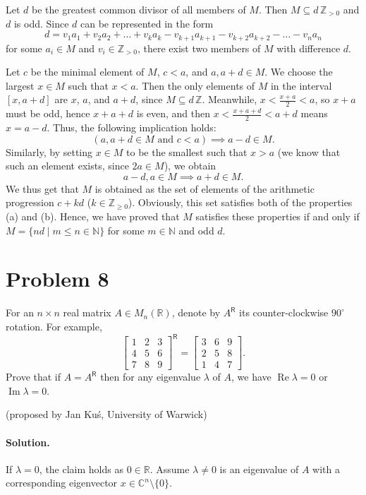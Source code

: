 \documentclass{article}
\begin{document}
Let $d$ be the greatest common divisor of all members of $M$. Then $M \subseteq d\,\mathbb{Z}_{>0}$ and $d$ is odd. Since $d$ can be represented in the form
\[
d = v_1 a_1 + v_2 a_2 + \ldots + v_k a_k - v_{k+1} a_{k+1} - v_{k+2} a_{k+2} - \ldots - v_n a_n
\]
for some $a_i \in M$ and $v_i \in \mathbb{Z}_{>0}$, there exist two members of $M$ with difference $d$.

Let $c$ be the minimal element of $M$, $c < a$, and $a, a+d \in M$. We choose the largest $x \in M$ such that $x < a$. Then the only elements of $M$ in the interval $[x, a+d]$ are $x$, $a$, and $a+d$, since $M \subseteq d\,\mathbb{Z}$. Meanwhile, $x < \frac{x+a}{2} < a$, so $x+a$ must be odd, hence $x + a + d$ is even, and then $x < \frac{x+a+d}{2} < a+d$ means $x = a - d$. Thus, the following implication holds:
\[
(a, a+d \in M \text{ and } c < a) \implies a - d \in M.
\]
Similarly, by setting $x \in M$ to be the smallest such that $x > a$ (we know that such an element exists, since $2a \in M$), we obtain
\[
a - d, a \in M \implies a + d \in M.
\]
We thus get that $M$ is obtained as the set of elements of the arithmetic progression $c + kd$ ($k \in \mathbb{Z}_{\geq 0}$). Obviously, this set satisfies both of the properties (a) and (b). Hence, we have proved that $M$ satisfies these properties if and only if $M = \{nd \mid m \leq n \in \mathbb{N}\}$ for some $m \in \mathbb{N}$ and odd $d$.

\section*{Problem 8}
For an $n \times n$ real matrix $A \in M_n(\mathbb{R})$, denote by $A^{\mathsf{R}}$ its counter-clockwise $90^\circ$ rotation. For example,
\[
\begin{bmatrix} 1 & 2 & 3 \\ 4 & 5 & 6 \\ 7 & 8 & 9 \end{bmatrix}^{\mathsf{R}} = \begin{bmatrix} 3 & 6 & 9 \\ 2 & 5 & 8 \\ 1 & 4 & 7 \end{bmatrix}.
\]
Prove that if $A = A^{\mathsf{R}}$ then for any eigenvalue $\lambda$ of $A$, we have $\operatorname{Re}\lambda = 0$ or $\operatorname{Im}\lambda = 0$.

(proposed by Jan Kuś, University of Warwick)

\paragraph{Solution.}
If $\lambda = 0$, the claim holds as $0 \in \mathbb{R}$. Assume $\lambda \neq 0$ is an eigenvalue of $A$ with a corresponding eigenvector $x \in \mathbb{C}^n \setminus \{0\}$.
\end{document}
